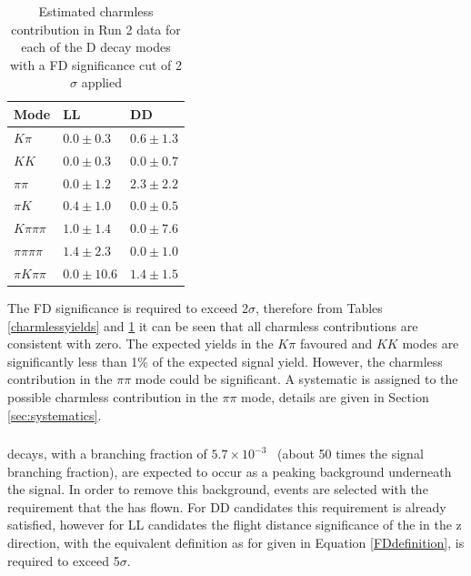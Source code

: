\begin{table}[h] 
\centering 
\begin{tabular}{lll} 
\hline 
Mode & LL & DD \\ 
\hline 
$K\pi$ & $0.0 \pm 0.3$ & $0.6 \pm 1.3$ \\ 
$KK$ & $0.0 \pm 0.3$ & $0.0 \pm 0.7$ \\ 
$\pi\pi$ & $0.0 \pm 1.2$ & $2.3 \pm 2.2$ \\ 
$\pi K$ & $0.4 \pm 1.0$ & $0.0 \pm 0.5$ \\ 
$K\pi\pi\pi$ & $1.0 \pm 1.4$ & $0.0 \pm 7.6$ \\ 
$\pi\pi\pi\pi$ & $1.4 \pm 2.3$ & $0.0 \pm 1.0$ \\ 
$\pi K \pi\pi$ & $0.0 \pm 10.6$ & $1.4 \pm 1.5$ \\ 
\hline 
\end{tabular} 
\caption{Estimated charmless contribution in Run 2 data for each of the D decay modes with a FD significance cut of 2$\sigma$ applied} 
\label{charmlessyieldsRun2}
\end{table}

The \Dz FD significance is required to exceed 2$\sigma$, therefore from Tables \ref{charmlessyields} and \ref{charmlessyieldsRun2} it can be seen that all charmless contributions are consistent with zero. The expected yields in the $K\pi$ favoured and $KK$ modes are significantly less than 1\% of the expected signal yield. However, the charmless contribution in the $\pi\pi$ mode could be significant. A systematic is assigned to the possible charmless contribution in the $\pi\pi$ mode, details are given in Section \ref{sec:systematics}. 

\subsubsection{\decay{\B}{\D\pi\pi\pi}}
\label{sec:backgrounds:b2dpipipi}

\decay{\B}{\D\pi\pi\pi} decays, with a branching fraction of $5.7 \times 10^{-3}$~\cite{PDG2014} (about 50 times the signal branching fraction), are expected to occur as a peaking background underneath the signal. In order to remove this background, events are selected with the requirement that the \KS has flown. For DD candidates this requirement is already satisfied, however for LL candidates the flight distance significance of the \KS in the z direction, with the equivalent definition as for \Dz given in Equation \ref{FDdefinition}, is required to exceed 5$\sigma$. 

